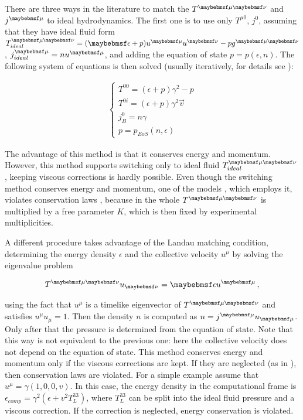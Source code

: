 There are three ways in the literature to match the $\Tmn$ and $\jmu$
to ideal hydrodynamics. The first one is to use only $T^{\mu0}$, $j^0$, assuming
that they have ideal fluid form $\Tmn_{ideal} = (\epsilon + p)u^{\mu}u^{\nu} - p
g^{\mu \nu}$, $\jmu_{ideal} = n u^{\mu}$, and adding the equation of state
$p = p(\epsilon,n)$. The following system of equations is then solved (usually
iteratively, for details see \cite{Pang:2012he}):

\begin{align} \label{eq:rest_frame_cons}
  \begin{cases}
    T^{00} = (\epsilon + p) \gamma^2 - p \\
    T^{0i} = (\epsilon + p) \gamma^2 \vec{v} \\
    j_B^0 = n \gamma \\
    p = p_{EoS}(n, \epsilon)
  \end{cases}
\end{align}

The advantage of this method is that it conserves energy and momentum. However,
this method supports switching only to ideal fluid $\Tmn_{ideal}$, keeping
viscous corrections is hardly possible. Even though the switching method
conserves energy and momentum, one of the models \cite{Pang:2012he}, which employs it, violates conservation laws , because in \cite{Pang:2012he} the whole
$\Tmn$ is multiplied by a free parameter $K$, which is then fixed by
experimental multiplicities.

A different procedure takes advantage of the Landau matching condition,
 determining the energy density $\epsilon$ and the collective
velocity $u^{\mu}$ by solving the eigenvalue problem

\begin{align} \label{eq:lrf}
  \Tmn u_{\nu} = \epsilon u^{\mu} \,,
\end{align}

using the fact that $u^{\mu}$ is a timelike eigenvector of $\Tmn$ and satisfies
$u^{\mu} u_{\mu} = 1$. Then the density $n$ is computed as $n = \jmu u_{\mu}$.
Only after that the pressure is determined from the equation of state. Note that
this way is not equivalent to the previous one: here the collective velocity
does not depend on the equation of state. This method conserves energy and
momentum only if the viscous corrections are kept. If they are neglected (as in
\cite{Werner:2010aa,Andrade:2005tx,Gale:2012rq}), then conservation laws are
violated. For a simple example assume that $u^{\mu} = \gamma(1,0,0,v)$. In this
case, the energy density in the computational frame is $\epsilon_{comp} =
\gamma^2(\epsilon + v^2 T^{33}_{L})$, where $T^{33}_L$ can be split into the
ideal fluid pressure and a viscous correction. If the correction is neglected,
energy conservation is violated.


